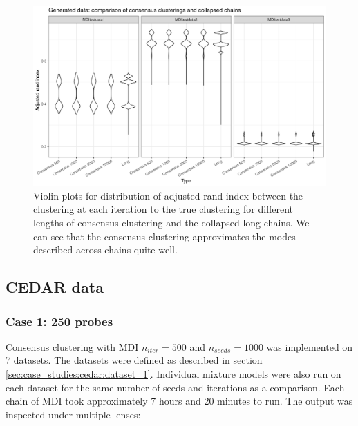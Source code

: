 \documentclass[12pt]{article} %
\begin{document}
	\newpage

	\begin{figure}[h]
		\centering
		\includegraphics[scale=0.65]{Images/Gen_data/Case_2/violin_plot_ari_true_clustering_collapsed_long.png}
		\caption{Violin plots for distribution of adjusted rand index between the clustering at each iteration to the true clustering for different lengths of consensus clustering and the collapsed long chains. We can see that the consensus clustering approximates the modes described across chains quite well.}
		\label{fig:gen_data_case_2_collapsed_violin_plot}
	\end{figure}

	\newpage

	\subsection{CEDAR data} \label{sec:results:cedar}
	\subsubsection{Case 1: 250 probes} \label{sec:results:cedar:dataset_1}
	Consensus clustering with MDI $n_{iter}=500$ and $n_{seeds}=1000$ was implemented on 7 datasets. The datasets were defined as described in section \ref{sec:case_studies:cedar:dataset_1}. Individual mixture models were also run on each dataset for the same number of seeds and iterations as a comparison. Each chain of MDI took approximately 7 hours and 20 minutes to run. The output was inspected under multiple lenses: 
	
\end{document}
